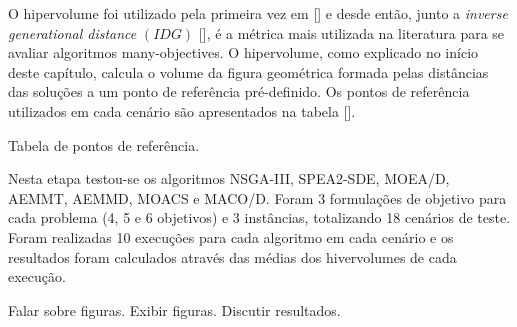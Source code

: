 O hipervolume foi utilizado pela primeira vez em [] e desde então, junto a \textit{inverse generational distance} $(IDG)$ [], é a métrica mais utilizada na literatura para se avaliar algoritmos many-objectives. O hipervolume, como explicado no início deste capítulo, calcula o volume da figura geométrica formada pelas distâncias das soluções a um ponto de referência pré-definido. Os pontos de referência utilizados em cada cenário são apresentados na tabela [].

Tabela de pontos de referência.

Nesta etapa testou-se os algoritmos NSGA-III, SPEA2-SDE, MOEA/D, AEMMT, AEMMD, MOACS e MACO/D. Foram 3 formulações de objetivo para cada problema (4, 5 e 6 objetivos) e 3 instâncias, totalizando 18 cenários de teste. Foram realizadas 10 execuções para cada algoritmo em cada cenário e os resultados foram calculados através das médias dos hivervolumes de cada execução.

Falar sobre figuras.
Exibir figuras.
Discutir resultados.